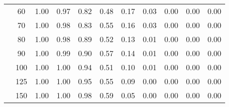 \begin{table}[t]
\begin{center}
\begin{subtable}[c]{\textwidth}
\begin{center}
\begin{tabular}{rcccccccccc}
                                        & \multicolumn{1}{c|}{60}  & \num{1.00}  & \num{0.97}  & \num{0.82}  & \num{0.48}  & \num{0.17}  & \num{0.03}  & \num{0.00}  & \num{0.00}  & \num{0.00}  \\
                                        & \multicolumn{1}{c|}{70}  & \num{1.00}  & \num{0.98}  & \num{0.83}  & \num{0.55}  & \num{0.16}  & \num{0.03}  & \num{0.00}  & \num{0.00}  & \num{0.00}  \\
                                        & \multicolumn{1}{c|}{80}  & \num{1.00}  & \num{0.98}  & \num{0.89}  & \num{0.52}  & \num{0.13}  & \num{0.01}  & \num{0.00}  & \num{0.00}  & \num{0.00}  \\
                                        & \multicolumn{1}{c|}{90}  & \num{1.00}  & \num{0.99}  & \num{0.90}  & \num{0.57}  & \num{0.14}  & \num{0.01}  & \num{0.00}  & \num{0.00}  & \num{0.00}  \\
                                        & \multicolumn{1}{c|}{100}  & \num{1.00}  & \num{1.00}  & \num{0.94}  & \num{0.51}  & \num{0.10}  & \num{0.01}  & \num{0.00}  & \num{0.00}  & \num{0.00}  \\
                                        & \multicolumn{1}{c|}{125}  & \num{1.00}  & \num{1.00}  & \num{0.95}  & \num{0.55}  & \num{0.09}  & \num{0.00}  & \num{0.00}  & \num{0.00}  & \num{0.00}  \\
                                        & \multicolumn{1}{c|}{150}  & \num{1.00}  & \num{1.00}  & \num{0.98}  & \num{0.59}  & \num{0.05}  & \num{0.00}  & \num{0.00}  & \num{0.00}  & \num{0.00}  \\
                                    \end{tabular}
            \end{center}
        \end{subtable}

        \vspace{5mm}


\end{center}
\end{table}

